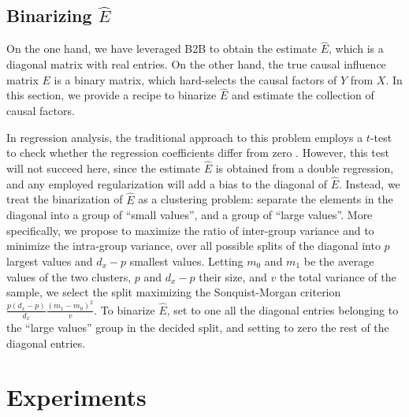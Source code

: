 \documentclass{article}
\begin{document}

\subsection{Binarizing $\hat{E}$}

On the one hand, we have leveraged B2B to obtain the estimate $\hat{E}$, which is a diagonal matrix with real entries.
%
On the other hand, the true causal influence matrix $E$ is a binary matrix, which hard-selects the causal factors of $Y$ from $X$.
%
In this section, we provide a recipe to binarize $\hat{E}$ and estimate the collection of causal factors.

In regression analysis, the traditional approach to this problem employs a $t$-test to check whether the regression coefficients differ from zero \citep{student1908probable}.
%
However, this test will not succeed here, since the estimate $\hat{E}$ is obtained from a double regression, and any employed regularization will add a bias to the diagonal of $\hat{E}$.
%
Instead, we treat the binarization of $\hat{E}$ as a clustering problem: separate the elements in the diagonal into a group of ``small values'', and a group of ``large values''.
%
More specifically, we propose to maximize the ratio of inter-group variance and to minimize the intra-group variance, over all possible splits of the diagonal into $p$ largest values and $d_x-p$ smallest values.
%
Letting $m_0$ and $m_1$ be the average values of the two clusters, $p$ and $d_x-p$ their size, and $v$ the total variance of the sample, we select the split maximizing the Sonquist-Morgan \citep{sonquist_morgan} criterion $\frac{p(d_x-p)}{d_x} \frac{(m_1 - m_0)^2}{v}$.
%
To binarize $\hat{E}$, set to one all the diagonal entries belonging to the ``large values'' group in the decided split, and setting to zero the rest of the diagonal entries.

\section{Experiments}
\end{document}
